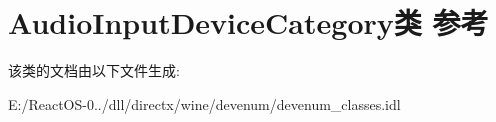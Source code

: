 \hypertarget{class_audio_input_device_category}{}\section{Audio\+Input\+Device\+Category类 参考}
\label{class_audio_input_device_category}


该类的文档由以下文件生成\+:\begin{DoxyCompactItemize}
\item 
E\+:/\+React\+O\+S-\/0../dll/directx/wine/devenum/devenum\+\_\+classes.\+idl\end{DoxyCompactItemize}
